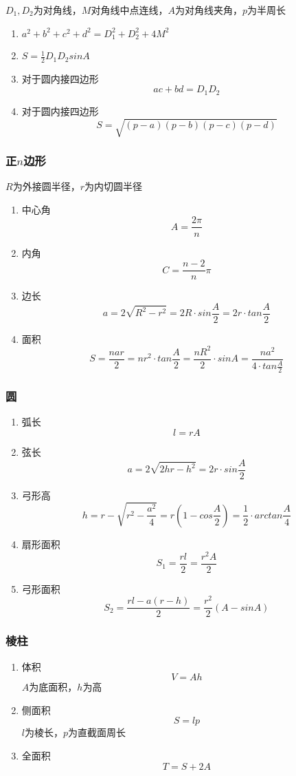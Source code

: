 \documentclass[a4paper]{article}
\begin{document}
$D_1, D_2$为对角线，$M$对角线中点连线，$A$为对角线夹角，$p$为半周长
\begin{enumerate}
	\item $a^2+b^2+c^2+d^2=D_1^2+D_2^2+4M^2$
	\item $S=\frac{1}{2}D_1D_2sinA$
	\item 对于圆内接四边形
	$$ac+bd=D_1D_2$$
	\item 对于圆内接四边形
	$$S=\sqrt{(p-a)(p-b)(p-c)(p-d)}$$
\end{enumerate}

\subsubsection{正$n$边形}

$R$为外接圆半径，$r$为内切圆半径
\begin{enumerate}
	\item 中心角
	$$A=\frac{2\pi}{n}$$
	\item 内角
	$$C=\frac{n-2}{n}\pi$$
	\item 边长
	$$a=2\sqrt{R^2-r^2}=2R \cdot sin\frac{A}{2}=2r \cdot tan\frac{A}{2}$$
	\item 面积
	$$S=\frac{nar}{2}=nr^2 \cdot tan\frac{A}{2}=\frac{nR^2}{2} \cdot sinA=\frac{na^2}{4 \cdot tan\frac{A}{2}}$$
\end{enumerate}

\subsubsection{圆}

\begin{enumerate}
	\item 弧长
	$$l=rA$$
	\item 弦长
	$$a=2\sqrt{2hr-h^2}=2r\cdot sin\frac{A}{2}$$
	\item 弓形高
	$$h=r-\sqrt{r^2-\frac{a^2}{4}}=r(1-cos\frac{A}{2})=\frac{1}{2} \cdot arctan\frac{A}{4}$$
	\item 扇形面积
	$$S_1=\frac{rl}{2}=\frac{r^2A}{2}$$
	\item 弓形面积
	$$S_2=\frac{rl-a(r-h)}{2}=\frac{r^2}{2}(A-sinA)$$
\end{enumerate}

\subsubsection{棱柱}

\begin{enumerate}
	\item 体积
	$$V=Ah$$
	$A$为底面积，$h$为高
	\item 侧面积
	$$S=lp$$
	$l$为棱长，$p$为直截面周长
	\item 全面积
	$$T=S+2A$$
\end{enumerate}
\end{document}
